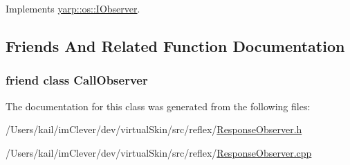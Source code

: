Implements \hyperlink{classyarp_1_1os_1_1_i_observer_a4829e5a6f2ba6666b9539a4a30f20790}{yarp::os::IObserver}.

\subsection{Friends And Related Function Documentation}
\hypertarget{class_response_observer_a83863f807465c9f8598a4ff381be0506}{
\subsubsection[{CallObserver}]{\setlength{\rightskip}{0pt plus 5cm}friend class {\bf CallObserver}}}
\label{class_response_observer_a83863f807465c9f8598a4ff381be0506}


The documentation for this class was generated from the following files:\begin{DoxyCompactItemize}
\item 
/Users/kail/imClever/dev/virtualSkin/src/reflex/\hyperlink{_response_observer_8h}{ResponseObserver.h}\item 
/Users/kail/imClever/dev/virtualSkin/src/reflex/\hyperlink{_response_observer_8cpp}{ResponseObserver.cpp}\end{DoxyCompactItemize}
